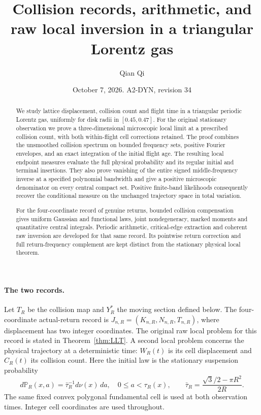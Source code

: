 \documentclass[11pt,reqno]{amsart}
\title[Collision records and raw local inversion]{Collision records, arithmetic, and raw local inversion in a triangular Lorentz gas}
\author{Qian Qi}
\date{October 7, 2026. A2-DYN, revision 34}
\numberwithin{equation}{section}
\theoremstyle{definition}\newtheorem{definition}[theorem]{Definition}
\theoremstyle{remark}\newtheorem{remark}[theorem]{Remark}
\begin{document}
\raggedbottom
\begin{abstract}
We study lattice displacement, collision count and flight time in a
triangular periodic Lorentz gas, uniformly for disk radii in
$[0.45,0.47]$. For the original stationary observation we prove a
three-dimensional microscopic local limit at a prescribed collision
count, with both within-flight cell corrections retained. The proof
combines the unsmoothed collision spectrum on bounded frequency sets,
positive Fourier envelopes, and an exact integration of the initial
flight age. The resulting local endpoint measures evaluate the full
physical probability and its regular initial and terminal insertions.
They also prove vanishing of the entire signed middle-frequency
inverse at a specified polynomial bandwidth and give a positive
microscopic denominator on every central compact set. Positive
finite-band likelihoods consequently recover the conditional measure
on the unchanged trajectory space in total variation.

For the four-coordinate record of genuine returns, bounded collision
compensation gives uniform Gaussian and functional laws, joint
nondegeneracy, marked moments and quantitative central integrals.
Periodic arithmetic, critical-edge extraction and coherent raw
inversion are developed for that same record. Its pointwise return
correction and full return-frequency complement are kept distinct from
the stationary physical local theorem.
\end{abstract}
\maketitle
\enlargethispage{3pt}

\paragraph{The two records.}
Let $T_R$ be the collision map and $Y_R^*$ the moving section defined
below. The four-coordinate actual-return record is
$J_{n,R}=(K_{n,R},N_{n,R},T_{n,R})$, where displacement has two integer
coordinates. The original raw local problem for this record is stated
in Theorem~\ref{thm:LLT}. A second local problem concerns the physical
trajectory at a deterministic time: $W_R(t)$ is its cell displacement
and $C_R(t)$ its collision count. Here the initial law is the stationary
suspension probability
\[
 d\mathbb P_R(x,a)=\bar\tau_R^{-1}d\nu(x)\,da,
 \quad 0\le a<\tau_R(x),\qquad
 \bar\tau_R=\frac{\sqrt3/2-\pi R^2}{2R}.
\]
The same fixed convex polygonal fundamental cell is used at both
observation times. Integer cell coordinates are used throughout.
\end{document}
